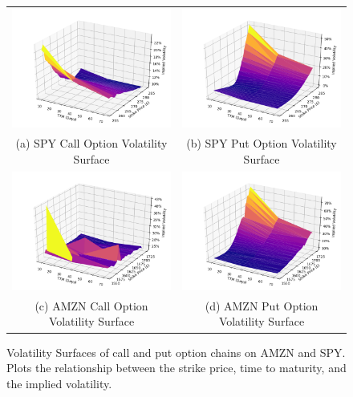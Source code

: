 \documentclass[10pt]{article}
\begin{document}
        \begin{figure}[!hb]
            \begin{tabular}{|c|c|}
                \hline
                \includegraphics[width=.47\textwidth]{bin/vol_surface/SPY_Call_3DVolSurface.png} &
                \includegraphics[width=.47\textwidth]{bin/vol_surface/SPY_Put_3DVolSurface.png} \\
                (a) SPY Call Option Volatility Surface &
                (b) SPY Put Option Volatility Surface \\
                \hline
                \includegraphics[width=.47\textwidth]{bin/vol_surface/AMZN_Call_3DVolSurface.png} &
                \includegraphics[width=.47\textwidth]{bin/vol_surface/AMZN_Put_3DVolSurface.png} \\
                (c) AMZN Call Option Volatility Surface &
                (d) AMZN Put Option Volatility Surface \\
                \hline
            \end{tabular}
            \caption{Volatility Surfaces of call and put option chains on AMZN and SPY. Plots the relationship between the strike price, time to maturity, and the implied volatility.}
            \label{fig:volatility_surfaces}
        \end{figure}
\end{document}
